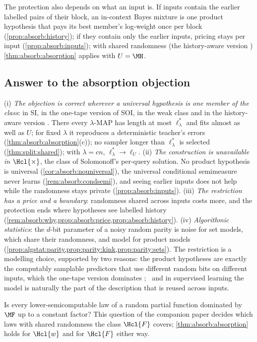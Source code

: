 The protection also depends on what an input is. If inputs contain the earlier labelled pairs of their block, an in-context Bayes mixture is one product hypothesis that pays its best member's log-weight once per block (\cref{prop:absorb:history}); if they contain only the earlier inputs, pricing stays per input (\cref{prop:absorb:inputs}); with shared randomness (the history-aware version \SFIhist{}) \cref{thm:absorb:absorption} applies with $U=\MH$.

\subsection{Answer to the absorption objection}\label{sec:absorb:answer}

\begin{remark}\label{rem:absorb:wyeth}
(i) \emph{The objection is correct wherever a universal hypothesis is one member of the class}: in SI, in the one-tape version of SOI, in the weak class and in the history-aware version \SFIhist{}. There every $\lambda$-MAP has length at most $\ell^*_\lambda$ and fits almost as well as $U$; for fixed $\lambda$ it reproduces a deterministic teacher's errors (\cref{thm:absorb:absorption}(c)); no sampler longer than $\ell^*_\lambda$ is selected (\cref{thm:split:shared}); with $\lambda=cn$, $\ell^*_\lambda\to\ell_U$. (ii) \emph{The construction is unavailable in $\Hcl{\times}$}, the class of Solomonoff's per-query solution. No product hypothesis is universal (\cref{cor:absorb:nouniversal}), the universal conditional semimeasure never learns (\cref{rem:absorb:condsemi}), and seeing earlier inputs does not help while the randomness stays private (\cref{prop:absorb:inputs}). (iii) \emph{The restriction has a price and a boundary}: randomness shared across inputs costs more, and the protection ends where hypotheses see labelled history (\cref{rem:absorb:why,prop:absorb:price,prop:absorb:history}). (iv) \emph{Algorithmic statistics}: the $d$-bit parameter of a noisy random parity is noise for set models, which share their randomness, and model for product models (\cref{prop:algstat:parity,prop:parity:kink,prop:parity:sets}).
The restriction is a modelling choice, supported by two reasons: the product hypotheses are exactly the computably samplable predictors that use different random bits on different inputs, which the one-tape version dominates \citep[Theorem~5.1(a)]{claudeSFI2026fundamentals};%
\ and in supervised learning the model is naturally the part of the description that is reused across inputs.
\end{remark}

\begin{question}\label{q:absorb:shared}
Is every lower-semicomputable law of a random partial function dominated by $\MF$ up to a constant factor? This question of the companion paper \citep[Question~3.14]{claudeSFI2026fundamentals} %
decides which laws with shared randomness the class $\Hcl{F}$ covers; \cref{thm:absorb:absorption} holds for $\Hcl{w}$ and for $\Hcl{F}$ either way.
\end{question}

